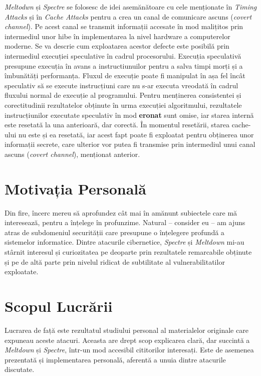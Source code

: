 \emph{Meltodwn} și \emph{Spectre} se folosesc de idei asemănătoare cu cele
menționate în \emph{Timing Attacks} și în \emph{Cache Attacks} pentru a crea un
canal de comunicare ascuns (\emph{covert channel}). Pe acest canal se transmit
informații accesate în mod malițitos prin intermediul unor hibe în
implementarea la nivel hardware a computerelor moderne. Se va descrie cum
exploatarea acestor defecte este posibilă prin intermediul execuției
speculative în cadrul procesorului. Execuția speculativă presupune execuția în
avans a instructiunuilor pentru a salva timpi morți și a îmbunătăți
performanța. Fluxul de execuție poate fi manipulat în așa fel încât speculativ
să se execute instrucțiuni care nu s-ar executa vreodată în cadrul fluxului
normal de execuție al programului. Pentru menținerea consistentei și
corectitudinii rezultatelor obținute în urma execuției algoritmului,
rezultatele instrucțiunilor executate speculativ în mod \textbf{eronat} sunt
omise, iar starea internă este resetată la una anterioară, dar corectă. În
momentul resetării, starea cache-ului nu este și ea resetată, iar acest fapt
poate fi exploatat pentru obținerea unor informații secrete, care ulterior vor
putea fi transmise prin intermediul unui canal ascuns (\emph{covert channel}),
menționat anterior.

\section{Motivația Personală}

Din fire, încerc mereu să aprofundez cât mai în amănunt subiectele care mă
interesează, pentru a înțelege în profunzime. Natural -- consider eu -- am
ajuns atras de subdomeniul securității care presupune o înțelegere profundă a
sistemelor informatice. Dintre atacurile cibernetice, \emph{Spectre} și
\emph{Meltdown} mi-au stârnit interesul și curiozitatea pe deoparte prin
rezultatele remarcabile obținute și pe de altă parte prin nivelul ridicat de
subtilitate al vulnerabilitatilor exploatate.

\section{Scopul Lucrării}

Lucrarea de față este rezultatul studiului personal al materialelor originale
care expuneau aceste atacuri. Aceasta are drept scop explicarea clară, dar
succintă a \emph{Meltdown} și \emph{Spectre}, într-un mod accesibil cititorilor
interesați. Este de asemenea prezentată și implementarea personală, aferentă
a unuia dintre atacurile discutate.

